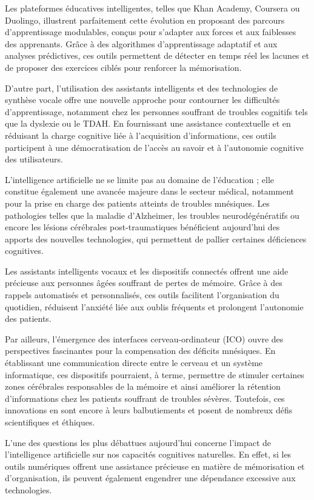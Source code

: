\documentclass[12pt,a4paper]{report}
\begin{document}
Les plateformes éducatives intelligentes, telles que Khan Academy, Coursera ou Duolingo, illustrent parfaitement cette évolution en proposant des parcours d’apprentissage modulables, conçus pour s’adapter aux forces et aux faiblesses des apprenants. Grâce à des algorithmes d’apprentissage adaptatif et aux analyses prédictives, ces outils permettent de détecter en temps réel les lacunes et de proposer des exercices ciblés pour renforcer la mémorisation.

D’autre part, l’utilisation des assistants intelligents et des technologies de synthèse vocale offre une nouvelle approche pour contourner les difficultés d’apprentissage, notamment chez les personnes souffrant de troubles cognitifs tels que la dyslexie ou le TDAH. En fournissant une assistance contextuelle et en réduisant la charge cognitive liée à l’acquisition d’informations, ces outils participent à une démocratisation de l’accès au savoir et à l’autonomie cognitive des utilisateurs.

L’intelligence artificielle ne se limite pas au domaine de l’éducation ; elle constitue également une avancée majeure dans le secteur médical, notamment pour la prise en charge des patients atteints de troubles mnésiques. Les pathologies telles que la maladie d’Alzheimer, les troubles neurodégénératifs ou encore les lésions cérébrales post-traumatiques bénéficient aujourd’hui des apports des nouvelles technologies, qui permettent de pallier certaines déficiences cognitives.

Les assistants intelligents vocaux et les dispositifs connectés offrent une aide précieuse aux personnes âgées souffrant de pertes de mémoire. Grâce à des rappels automatisés et personnalisés, ces outils facilitent l’organisation du quotidien, réduisent l’anxiété liée aux oublis fréquents et prolongent l’autonomie des patients.

Par ailleurs, l’émergence des interfaces cerveau-ordinateur (ICO) ouvre des perspectives fascinantes pour la compensation des déficits mnésiques. En établissant une communication directe entre le cerveau et un système informatique, ces dispositifs pourraient, à terme, permettre de stimuler certaines zones cérébrales responsables de la mémoire et ainsi améliorer la rétention d’informations chez les patients souffrant de troubles sévères. Toutefois, ces innovations en sont encore à leurs balbutiements et posent de nombreux défis scientifiques et éthiques.

L’une des questions les plus débattues aujourd’hui concerne l’impact de l’intelligence artificielle sur nos capacités cognitives naturelles. En effet, si les outils numériques offrent une assistance précieuse en matière de mémorisation et d’organisation, ils peuvent également engendrer une dépendance excessive aux technologies.
\end{document}
